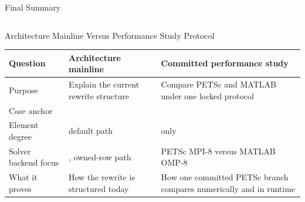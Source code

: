 \documentclass[aspectratio=169,10pt]{beamer}
\begin{document}
\begin{frame}{Final Summary}
\small
\begin{columns}[T,totalwidth=\textwidth]
\begin{column}{0.32\textwidth}
\end{column}
\begin{column}{0.32\textwidth}
\end{column}
\begin{column}{0.32\textwidth}
\end{column}
\end{columns}
\end{frame}

\appendix
{}

\begin{frame}{Architecture Mainline Versus Performance Study Protocol}
\small
\begin{tabularx}{\textwidth}{p{}p{}Y}
\toprule
\textbf{Question} & \textbf{Architecture mainline} & \textbf{Committed performance study} \\
\midrule
Purpose & Explain the current rewrite structure & Compare PETSc and MATLAB under one locked protocol \\
Case anchor &  &  \\
Element degree &  default path &  only \\
Solver backend focus & , owned-row path & PETSc MPI-8 versus MATLAB OMP-8 \\
What it proves & How the rewrite is structured today & How one committed PETSc branch compares numerically and in runtime \\
\bottomrule
\end{tabularx}
\end{frame}
\end{document}
